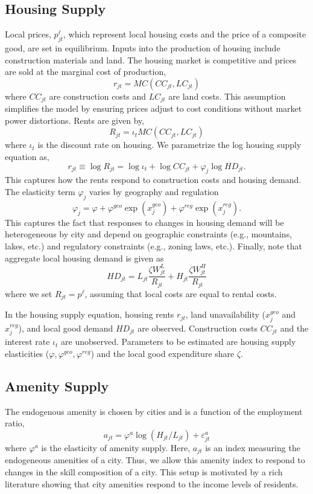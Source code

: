 \documentclass{article}
\begin{document}
\subsection{Housing Supply}
Local prices, $p^\ell_{jt}$, which represent local housing costs and the price of a composite good, are set in equilibrium. Inputs into the production of housing include construction materials and land. The housing market is competitive and prices are sold at the marginal cost of production,
$$r_{jt} = MC(CC_{jt}, LC_{jt})$$
where $CC_{jt}$ are construction costs and $LC_{jt}$ are land costs. This assumption simplifies the model by ensuring prices adjust to cost conditions without market power distortions. Rents are given by,
$$R_{jt} = \iota_t MC(CC_{jt},LC_{jt})$$
where $\iota_t$ is the discount rate on housing. We parametrize the log housing supply equation as,
\begin{equation}\label{eq: housing supply}
    r_{jt} \equiv \log R_{jt} = \log \iota_t + \log CC_{jt} + \varphi_j \log HD_{jt}.
\end{equation}
This captures how the rents respond to construction costs and housing demand. The elasticity term $\varphi_j$ varies by geography and regulation
$$\varphi_j = \varphi + \varphi^{geo}\exp(x_j^{geo}) + \varphi^{reg} \exp(x_j^{reg}).$$
This captures the fact that responses to changes in housing demand will be heterogeneous by city and depend on geographic constraints (e.g., mountains, lakes, etc.) and regulatory constraints (e.g., zoning laws, etc.). 
Finally, note that aggregate local housing demand is given as
\begin{equation} \label{eq: housing demand}
HD_{jt} = L_{jt} \frac{\zeta W_{jt}^L}{R_{jt}} + H_{jt} \frac{\zeta W_{jt}^H}{R_{jt}}
\end{equation}
where we set $R_{jt} = p^\ell$, assuming that local costs are equal to rental costs.

In the housing supply equation, housing rents $r_{jt}$, land unavailability ($x^{geo}_j$ and $x^{reg}_j$), and local good demand $HD_{jt}$ are observed. Construction costs $CC_{jt}$ and the interest rate $\iota_t$ are unobserved. Parameters to be estimated are housing supply elasticities ($\varphi, \varphi^{geo}, \varphi^{reg}$) and the local good expenditure share $\zeta$.   

\subsection{Amenity Supply}
The endogenous amenity is chosen by cities and is a function of the employment ratio,
\begin{equation}\label{eq: amenity supply} 
a_{jt} = \varphi^a \log(H_{jt}/L_{jt}) + \varepsilon^a_{jt} \end{equation}
where $\varphi^a$ is the elasticity of amenity supply. Here, $a_{jt}$ is an index measuring the endogeneous amenities of a city. Thus, we allow this amenity index to respond to changes in the skill composition of a city. This setup is motivated by a rich literature showing that city amenities respond to the income levels of residents. 
\end{document}
